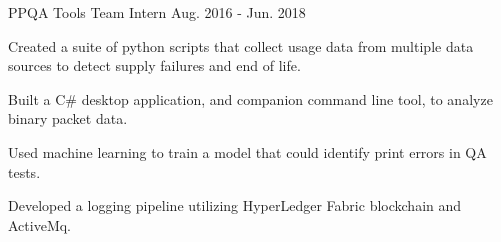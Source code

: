 \begin{cventries}
  \cventry
    {PPQA Tools Team Intern} %
    { } %
    { } %
    {Aug. 2016 - Jun. 2018} %
    {
      \begin{cvitems} %
        \item {Created a suite of python scripts that collect usage data from multiple data sources to detect supply failures and end of life.}
        \item {Built a C\# desktop application, and companion command line tool, to analyze binary packet data.}
        \item {Used machine learning to train a model that could identify print errors in QA tests.}
        \item {Developed a logging pipeline utilizing HyperLedger Fabric blockchain and ActiveMq.}
      \end{cvitems}
    }

\end{cventries}
